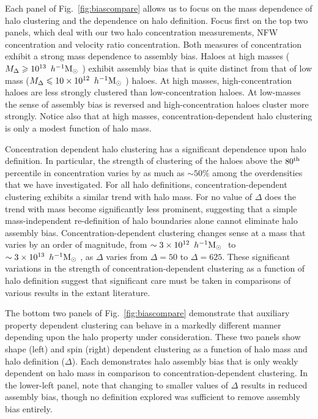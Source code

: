\documentclass[usenatbib,fleqn]{mnras}
\begin{document}
Each panel of Fig.~\ref{fig:biascompare} allows us to focus on the mass dependence of halo clustering and the dependence on halo definition. Focus first on the top two panels, which deal with our two halo concentration measurements, NFW concentration and velocity ratio concentration. Both measures of concentration exhibit a strong mass dependence to assembly bias. Haloes at high masses ($M_{\Delta} \geqslant 10^{13}\, \ h^{-1}\mathrm{M}_{\odot}~$) exhibit assembly bias that is quite distinct from that of low mass ($M_{\Delta} \leqslant 10\times10^{12}\, \ h^{-1}\mathrm{M}_{\odot}~$) haloes. 
At high masses, high-concentration haloes are less strongly clustered than low-concentration haloes. At low-masses the sense of assembly bias is reversed and high-concentration haloes cluster more strongly. Notice also that at high masses, concentration-dependent halo clustering is only a modest function of halo mass.

	Concentration dependent halo clustering has a significant dependence upon halo definition. In particular, the strength of clustering of the haloes above the $80^{\rm{th}}$ percentile in concentration varies by as much as $\sim 50\%$ among the overdensities that we have investigated. For all halo definitions, concentration-dependent clustering exhibits a similar trend with halo mass. For no value of $\Delta$ does the trend with mass become significantly less prominent, suggesting that a simple mass-independent re-definition of halo boundaries alone cannot eliminate halo assembly bias. Concentration-dependent clustering changes sense at a mass that varies by an order of magnitude, from $\sim 3 \times 10^{12}\, \ h^{-1}\mathrm{M}_{\odot}~$ to $\sim 3 \times 10^{13}\, \ h^{-1}\mathrm{M}_{\odot}~$, as $\Delta$ varies from $\Delta=50$ to $\Delta=625$. These significant variations in the strength of concentration-dependent clustering as a function of halo definition suggest that significant care must be taken in comparisons of various results in the extant literature.

The bottom two panels of Fig.~\ref{fig:biascompare} demonstrate that auxiliary property dependent clustering can behave in a markedly different manner depending upon the halo property under consideration. These two panels show shape (left) and spin (right) dependent clustering as a function of halo mass and halo definition ($\Delta$). Each demonstrates halo assembly bias that is only weakly dependent on halo mass in comparison to concentration-dependent clustering. In the lower-left panel, note that changing to smaller values of $\Delta$ results in reduced assembly bias, though no definition explored was sufficient to remove assembly bias entirely. 
\end{document}
